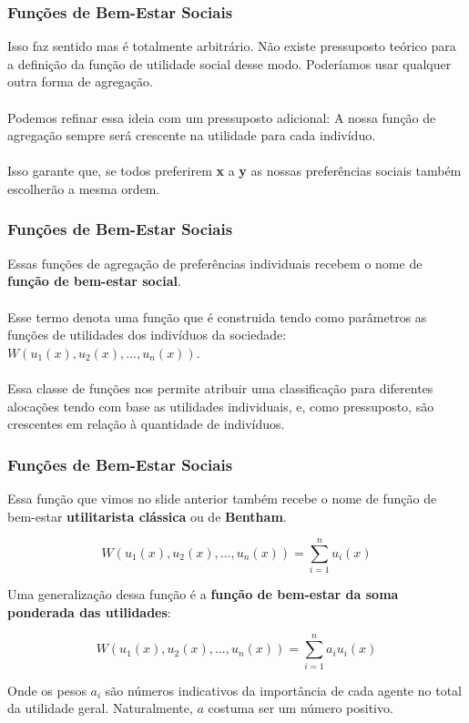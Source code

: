 \documentclass{beamer}[10]
\begin{document}
\begin{frame}
	\frametitle{Funções de Bem-Estar Sociais}

	Isso faz sentido mas é totalmente arbitrário. Não existe pressuposto teórico para a definição da função de utilidade social desse modo. Poderíamos usar qualquer outra forma de agregação.
	\\~\\
	Podemos refinar essa ideia com um pressuposto adicional: A nossa função de agregação sempre será crescente na utilidade para cada indivíduo.
	\\~\\
	Isso garante que, se todos preferirem \textbf{x} a \textbf{y} as nossas preferências sociais também escolherão a mesma ordem.

\end{frame}

\begin{frame}
	\frametitle{Funções de Bem-Estar Sociais}

	Essas funções de agregação de preferências individuais recebem o nome de \textbf{função de bem-estar social}.
	\\~\\
	Esse termo denota uma função que é construida tendo como parâmetros as funções de utilidades dos indivíduos da sociedade: $W(u_1(x),u_2(x),...,u_n(x))$.
	\\~\\
	Essa classe de funções nos permite atribuir uma classificação para diferentes alocações tendo com base as utilidades individuais, e, como pressuposto, são crescentes em relação à quantidade de indivíduos.

\end{frame}

\begin{frame}
	\frametitle{Funções de Bem-Estar Sociais}

	Essa função que vimos no slide anterior também recebe o nome de função de bem-estar \textbf{utilitarista clássica} ou de \textbf{Bentham}.

	$$ W(u_1(x),u_2(x),...,u_n(x)) = \displaystyle \sum^n_{i = 1} u_i(x)$$

	Uma generalização dessa função é a \textbf{função de bem-estar da soma ponderada das utilidades}:

	$$ W(u_1(x),u_2(x),...,u_n(x)) = \displaystyle \sum^n_{i = 1} a_iu_i(x)$$

	Onde os pesos $a_i$ são números indicativos da importância de cada agente no total da utilidade geral. Naturalmente, $a$ costuma ser um número positivo.

\end{frame}
\end{document}
